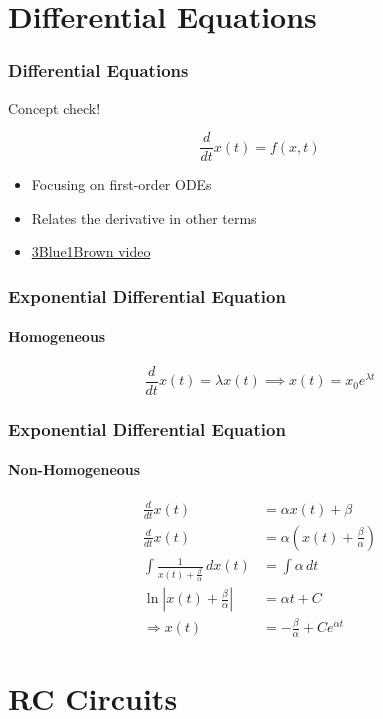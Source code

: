 \documentclass[aspectratio=169]{beamer}
\newcommand{\diff}[1]{\frac{d}{d #1}}
\begin{document}
\section{Differential Equations}

\begin{frame}
    \frametitle{Differential Equations}

    Concept check! \pause

    \begin{equation}
        \diff{t} x(t) = f(x, t)
    \end{equation}
    \begin{itemize}
        \item Focusing on first-order ODEs
        \item Relates the derivative in other terms
        \item \href{https://youtu.be/p_di4Zn4wz4?list=PLZHQObOWTQDNPOjrT6KVlfJuKtYTftqH6}{3Blue1Brown video}
    \end{itemize}
\end{frame}

\begin{frame}
    \frametitle{Exponential Differential Equation}
    \framesubtitle{Homogeneous}

    \begin{equation}
        \diff{t} x(t) = \lambda x(t) \implies x(t) = x_0 e^{\lambda t}
    \end{equation}
\end{frame}

\begin{frame}
    \frametitle{Exponential Differential Equation}
    \framesubtitle{Non-Homogeneous}

    \begin{align}
        \diff{t} x(t) &= \alpha x(t) + \beta \\
        \diff{t} x(t) &= \alpha \left(x(t) + \frac{\beta}{\alpha}\right) \\
        \int \frac{1}{x(t) + \frac{\beta}{\alpha}} \, dx(t) &= \int \alpha \, dt \\
        \ln\left|x(t) + \frac{\beta}{\alpha}\right| &= \alpha t + C \\
        \Rightarrow x(t) &= -\frac{\beta}{\alpha} + C e^{\alpha t}
    \end{align}
\end{frame}

\section{RC Circuits}
\end{document}
